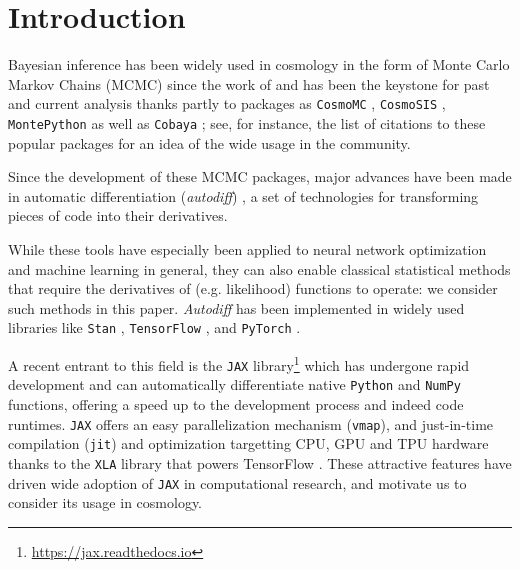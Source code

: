 \documentclass[twocolumn,twocolappendix,nofootinbib]{openjournal}
\begin{document}
\maketitle




\section{Introduction}
Bayesian inference has been widely used in cosmology in the form of Monte Carlo Markov Chains (MCMC) since the work of \citep{2001ApJ...563L..95K,2003MNRAS.341.1084R} and has been the keystone for past and current analysis thanks partly to packages as  \texttt{CosmoMC} \citep{2002PhRvD..66j3511L}, \texttt{CosmoSIS} \citep{2015A&C....12...45Z}, \texttt{MontePython} \citep{2019PDU....24..260B} as well as   \texttt{Cobaya} \citep{2019ascl.soft10019T,2021JCAP...05..057T}; see, for instance, the list of citations to these popular packages for an idea of the wide usage in the community. 


Since the development of these MCMC packages, major advances have been made in automatic differentiation (\textit{autodiff}) \citep{2015arXiv150205767G, 2018arXiv181105031M}, a set of technologies for transforming pieces of code into their derivatives.

While these tools have especially been applied to neural network optimization and machine learning in general, they can also enable classical statistical methods that require the derivatives of (e.g. likelihood) functions to operate: we consider such methods in this paper. \textit{Autodiff} has been implemented in widely used libraries like \texttt{Stan} \citep{JSSv076i01}, \texttt{TensorFlow}  \citep{tensorflow2015-whitepaper}, and  \texttt{PyTorch} \citep{NEURIPS2019_9015}. 

A recent entrant to this field is the \texttt{JAX} library\footnote{\url{https://jax.readthedocs.io}} \citep{jax2018github} which has undergone rapid development and can automatically differentiate native \texttt{Python} and \texttt{NumPy} functions, offering a speed up to the development process and indeed code runtimes. \texttt{JAX} offers an easy parallelization mechanism (\texttt{vmap}), and just-in-time compilation (\texttt{jit}) and optimization targetting CPU, GPU and TPU hardware thanks to the \texttt{XLA} library that powers TensorFlow . These attractive features have driven wide adoption of \texttt{JAX} in computational research, and motivate us to consider its usage in cosmology.
\end{document}
